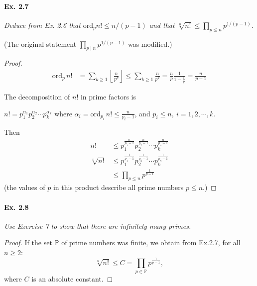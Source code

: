 \documentclass[11pt,a4paper]{article}
\newcommand{\ord}{\mathrm{ord}}
\begin{document}
{\paragraph{Ex. 2.7}

{\it Deduce from Ex. 2.6 that $\ord_p n! \leq n/(p - 1)$ and that $\sqrt[n]{n!} \leq \prod_{p \leq n} p^{1/(p-1)}$.
}

(The original statement $\prod_{p \mid n} p^{1/(p-1)}$ was modified.)
\begin{proof}
\begin{align*}
\ord_p\, n!  &= \sum_{k\geq 1} \left \lfloor \frac{n}{p^{k}}\right \rfloor \leq  \sum_{k\geq 1}  \frac{n}{p^{k}} = \frac{n}{p} \frac{1}{1 - \frac{1}{p}} = \frac{n}{p-1}
\end{align*}

The decomposition of $n!$ in prime factors is

$n! = p_1^{\alpha_1}p_2^{\alpha_2}\cdots p_k^{\alpha_k}$ 
where $\alpha_i = \ord_{p_i}\, n! \leq \frac{n}{p_i-1}$, and $p_i \leq n, \ i=1,2,\cdots,k$.

Then
\begin{align*}
n! &\leq p_1^{\frac{n}{p_1-1}}p_2^{\frac{n}{p_2-1}}\cdots p_k^{\frac{n}{p_n-1}}\\
\sqrt[n]{n!} &\leq p_1^{\frac{1}{p_1-1}}p_2^{\frac{1}{p_2-1}}\cdots p_k^{\frac{1}{p_n-1}}\\
&\leq \prod_{p\leq n} p^{\frac{1}{p-1}}
\end{align*}
(the values of $p$ in this product describe all prime numbers $p\leq n$.)
\end{proof}

\paragraph{Ex. 2.8}

{\it Use Exercise 7 to show that there are infinitely many primes.
}

\begin{proof}
If the set $\mathbb{P}$ of prime numbers was finite, we obtain from Ex.2.7, for all $n \geq 2$:
$$\sqrt[n]{n!} \leq C = \prod_{p\in \mathbb{P}} p^{\frac{1}{p-1}},$$
where $C$ is an absolute constant.


\end{proof}}
\end{document}
